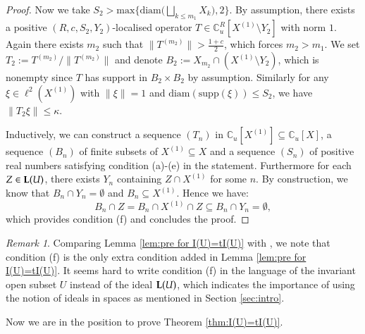 \documentclass[12pt, a4paper]{amsart}
\numberwithin{equation}{section}
\theoremstyle{definition}
\theoremstyle{remark}
\newtheorem{rem}[thm]{Remark}
\def\CC{\mathbb{C}}
\def\L{\mathcal{L}}
\def\supp{\mathrm{supp}}
\def\diam{\mathrm{diam}}
\def\max{\mathrm{max}}
\def\L{{\bf L}}
\begin{document}
\begin{proof}
Now we take $S_2> \max\big\{\diam\big( \bigsqcup_{k \leq m_1} X_k \big), 2\big\}$. By assumption, there exists a positive $(R,c,S_2,Y_2)$-localised operator $T \in \CC^R_u[X^{(1)} \setminus Y_2]$ with norm $1$. Again there exists $m_2$ such that $\|T^{(m_2)}\| > \frac{1+c}{2}$, which forces $m_2 > m_1$. We set $T_2 := T^{(m_2)} / \|T^{(m_2)}\|$ and denote $B_2:=X_{m_2} \cap (X^{(1)} \setminus Y_2)$, which is nonempty since $T$ has support in $B_2 \times B_2$ by assumption. Similarly for any $\xi \in \ell^2(X^{(1)})$ with $\|\xi\|=1$ and $\diam(\supp(\xi)) \leq S_2$, we have $\|T_2 \xi\| \leq \kappa$.

Inductively, we can construct a sequence $(T_n)$ in $\CC_u[X^{(1)}] \subseteq \CC_u[X]$, a sequence $(B_n)$ of finite subsets of $X^{(1)} \subseteq X$ and a sequence $(S_n)$ of positive real numbers satisfying condition (a)-(e) in the statement. Furthermore for each $Z \in \L(U)$, there exists $Y_n$ containing $Z \cap X^{(1)}$ for some $n$. By construction, we know that $B_n\cap Y_n = \emptyset$ and $B_n \subseteq X^{(1)}$. Hence we have:
\[
B_n \cap Z = B_n \cap X^{(1)} \cap Z \subseteq B_n \cap Y_n = \emptyset,
\]
which provides condition (f) and concludes the proof.
\end{proof}


\begin{rem}\label{rem:importance of ideals in space}
Comparing Lemma \ref{lem:pre for I(U)=tI(U)} with \cite[Lemma 4.2]{RW14}, we note that condition (f) is the only extra condition added in Lemma \ref{lem:pre for I(U)=tI(U)}. It seems hard to write condition (f) in the language of the invariant open subset $U$ instead of the ideal $\L(U)$, which indicates the importance of using the notion of ideals in spaces as mentioned in Section \ref{sec:intro}.
\end{rem}


Now we are in the position to prove Theorem \ref{thm:I(U)=tI(U)}.
\end{document}

